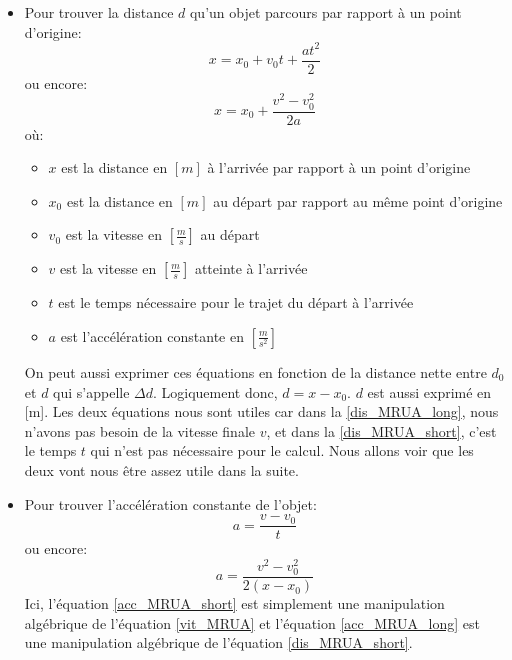 \documentclass{article}
\begin{document}
\begin{itemize}
    \item Pour trouver la distance $d$ qu'un objet parcours par rapport à un point d'origine:
        \begin{equation}
        \label{dis_MRUA_long}    
        x=x_0+v_0t+\frac{at^2}{2}
        \end{equation}
        ou encore:
        \begin{equation}
        \label{dis_MRUA_short}    
        x=x_0+\frac{v^2-v_0^2}{2a}
        \end{equation}
        où:
        \begin{itemize}
            \item $x$ est la distance en $[m]$ à l'arrivée par rapport à un point d'origine
            \item $x_0$ est la distance en $[m]$ au départ par rapport au même point d'origine
            \item $v_0$ est la vitesse en $[\frac{m}{s}]$ au départ
            \item $v$ est la vitesse en $[\frac{m}{s}]$ atteinte à l'arrivée
            \item $t$ est le temps nécessaire pour le trajet du départ à l'arrivée
            \item $a$ est l'accélération constante en $[\frac{m}{s^2}]$
            
        \end{itemize}
        On peut aussi exprimer ces équations en fonction de la distance nette entre $d_0$ et $d$ qui s'appelle $\Delta d$. Logiquement donc, $d = x-x_0$. $d$ est aussi exprimé en [m].
        \newline Les deux équations nous sont utiles car dans la \ref{dis_MRUA_long}, nous n'avons pas besoin de la vitesse finale $v$, et dans la \ref{dis_MRUA_short}, c'est le temps $t$ qui n'est pas nécessaire pour le calcul. Nous allons voir que les deux vont nous être assez utile dans la suite.
        \vspace{0.4cm}

    \item Pour trouver l'accélération constante de l'objet:
        \begin{equation}
        \label{acc_MRUA_short}    
        a = \frac{v-v_0}{t}
        \end{equation}
        ou encore:
        \begin{equation}
        \label{acc_MRUA_long}    
        a = \frac{v^2-v_0^2}{2(x-x_0)}
        \end{equation}
        Ici, l'équation \ref{acc_MRUA_short} est simplement une manipulation algébrique de l'équation \ref{vit_MRUA} et l'équation \ref{acc_MRUA_long} est une manipulation algébrique de l'équation \ref{dis_MRUA_short}.
    \vspace{0.4cm}
    
\end{itemize}
\end{document}
